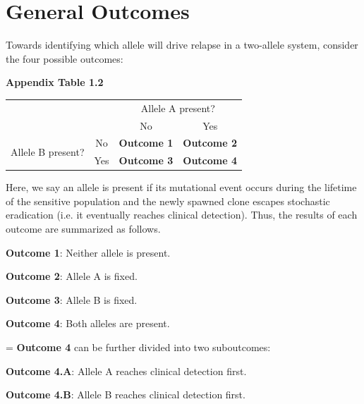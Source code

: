 \documentclass{article}
\begin{document}
\section{General Outcomes}

Towards identifying which allele will drive relapse in a two-allele system, consider the four possible outcomes:

\begin{center}
\textbf{Appendix Table 1.2}

\begin{tabular}{|c|c|c|c|}
\hline
\multicolumn{2}{|c|}{\multirow{2}{*}{}}  & \multicolumn{2}{c|}{Allele A present?} \\ \cline{3-4} 
\multicolumn{2}{|c|}{}                   & No                 & Yes               \\ \hline
\multirow{2}{*}{Allele B present?} & No  & \textbf{Outcome 1}             & \textbf{Outcome 2}            \\ \cline{2-4} 
                                   & Yes & \textbf{Outcome 3}             & \textbf{Outcome 4}            \\ \hline
\end{tabular}
\end{center}


Here, we say an allele is present if its mutational event occurs during the lifetime of the sensitive population and the newly spawned clone escapes stochastic eradication (i.e. it eventually reaches clinical detection).  Thus, the results of each outcome are summarized as follows.

\begin{description}
\item{\textbf{Outcome 1}: Neither allele is present.}
\item{\textbf{Outcome 2}: Allele A is fixed.}
\item{\textbf{Outcome 3}: Allele B is fixed.}
\item{\textbf{Outcome 4}: Both alleles are present.}
\end{description}
\parskip = \baselineskip
\textbf{Outcome 4} can be further divided into two suboutcomes:
\begin{description}
\item{\textbf{Outcome 4.A}: Allele A reaches clinical detection first.}
\item{\textbf{Outcome 4.B}: Allele B reaches clinical detection first.}
\end{description}
\end{document}
